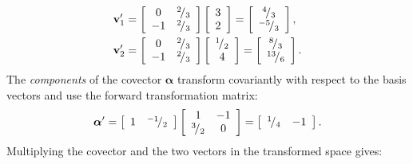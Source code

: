 \begin{align}
  \mathbf{v}_1' 
  &= \left[ \begin{array}{c c} 0 & \rfrac{2}{3} \\  -1 & \rfrac{2}{3} \end{array} \right] \left[ \begin{array}{c} 3 \\ 2 \\ \end{array} \right] 
   = \left[ \begin{array}{c} \rfrac{4}{3} \\ \rfrac{-5}{3} \\ \end{array} \right], \nonumber \\
  \mathbf{v}_2' 
  &= \left[ \begin{array}{c c} 0 & \rfrac{2}{3} \\  -1 & \rfrac{2}{3} \end{array} \right] \left[ \begin{array}{c} \rfrac{1}{2} \\ 4 \\ \end{array} \right]
   = \left[ \begin{array}{c} \rfrac{8}{3} \\ \rfrac{13}{6} \\ \end{array} \right]. \nonumber
\end{align}
The \emph{components} of the covector $\boldsymbol\alpha$ transform covariantly with respect to the basis vectors and use the forward transformation matrix:
\begin{align}
  \boldsymbol\alpha' 
  = \left[ \begin{array}{c c} 1 & {}^{-1}\!/_{2} \\ \end{array} \right] \left[ \begin{array}{c c} 1 & -1 \\ {}^{3}\!/_{2} & 0 \end{array} \right]
  = \left[ \begin{array}{c c} {}^{1}\!/_{4} & -1 \end{array} \right] . \nonumber
\end{align}
Multiplying the covector and the two vectors in the transformed space gives:
